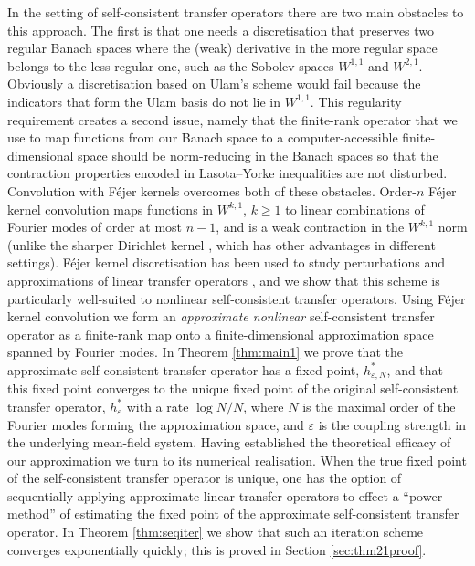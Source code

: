 \documentclass[12pt]{article}
\newcommand{\eps}{\varepsilon}
\theoremstyle{plain}
\begin{document}
In the setting of self-consistent transfer operators there are two main obstacles to this approach.
The first is that  
one needs a discretisation that preserves two regular Banach spaces where the (weak) derivative in the more regular space belongs to the less regular one, such as the Sobolev spaces $W^{1,1}$ and $W^{2,1}$. Obviously a discretisation based on Ulam's scheme would fail
because the indicators that form the Ulam basis do not lie in $W^{1,1}$.
This regularity requirement creates a second issue, namely that the finite-rank operator that we use to map functions from our Banach space to a computer-accessible finite-dimensional space should be norm-reducing in the Banach spaces so that the contraction properties encoded in Lasota--Yorke inequalities are not disturbed.
Convolution with F\'ejer kernels \cite{Fe1904} overcomes both of these obstacles.
Order-$n$ F\'ejer kernel convolution maps functions in $W^{k,1}$, $k\ge 1$ to linear combinations of Fourier modes of order at most $n-1$, and is a weak contraction in the $W^{k,1}$ norm (unlike the sharper Dirichlet kernel \cite{W19}, which has other advantages in different settings).
F\'ejer kernel discretisation has been used to study perturbations and approximations of linear transfer operators \cite{CF20,FGQ14,FP25}, and we show that this scheme is particularly well-suited to nonlinear self-consistent transfer operators.
Using F\'ejer kernel convolution we form an \textit{approximate nonlinear } self-consistent transfer operator as a finite-rank map onto a finite-dimensional approximation space spanned by Fourier modes.
 In Theorem \ref{thm:main1} we prove that the approximate self-consistent transfer operator has a fixed point, $h^*_{\eps,N}$, and that this fixed point converges to the unique fixed point of the original self-consistent transfer operator, $h^*_\eps$ with a rate $\log{N}/N$, where $N$ is the maximal order of the Fourier modes forming the approximation space, and $\eps$ is the coupling strength in the underlying mean-field system. 
 Having established the theoretical efficacy of our approximation we turn to its numerical realisation. When the true fixed point of the self-consistent transfer operator is unique, one has the option of sequentially applying approximate linear transfer operators to effect a ``power method'' of estimating the fixed point of the approximate self-consistent transfer operator. In Theorem \ref{thm:seqiter} we show that such an iteration scheme converges exponentially quickly; this is proved in Section \ref{sec:thm21proof}.
\end{document}
